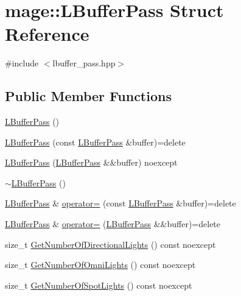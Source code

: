 \hypertarget{structmage_1_1_l_buffer_pass}{}\section{mage\+:\+:L\+Buffer\+Pass Struct Reference}
\label{structmage_1_1_l_buffer_pass}


{\ttfamily \#include $<$lbuffer\+\_\+pass.\+hpp$>$}

\subsection*{Public Member Functions}
\begin{DoxyCompactItemize}
\item 
\hyperlink{structmage_1_1_l_buffer_pass_acde2812780af700501ca945d62ed3dcc}{L\+Buffer\+Pass} ()
\item 
\hyperlink{structmage_1_1_l_buffer_pass_a0cd35fd1ded3c17d04c1689d1e30e476}{L\+Buffer\+Pass} (const \hyperlink{structmage_1_1_l_buffer_pass}{L\+Buffer\+Pass} \&buffer)=delete
\item 
\hyperlink{structmage_1_1_l_buffer_pass_ae68baaaa3fee2a76d64037f58d3e389b}{L\+Buffer\+Pass} (\hyperlink{structmage_1_1_l_buffer_pass}{L\+Buffer\+Pass} \&\&buffer) noexcept
\item 
\hyperlink{structmage_1_1_l_buffer_pass_ae9bad6fa2eb3827f9e28a3f21a974496}{$\sim$\+L\+Buffer\+Pass} ()
\item 
\hyperlink{structmage_1_1_l_buffer_pass}{L\+Buffer\+Pass} \& \hyperlink{structmage_1_1_l_buffer_pass_aec86026cd14a4b1609f709444bc453bd}{operator=} (const \hyperlink{structmage_1_1_l_buffer_pass}{L\+Buffer\+Pass} \&buffer)=delete
\item 
\hyperlink{structmage_1_1_l_buffer_pass}{L\+Buffer\+Pass} \& \hyperlink{structmage_1_1_l_buffer_pass_a3e4405a5af87c2c6f4839cb8502aa5de}{operator=} (\hyperlink{structmage_1_1_l_buffer_pass}{L\+Buffer\+Pass} \&\&buffer)=delete
\item 
size\+\_\+t \hyperlink{structmage_1_1_l_buffer_pass_a8a8c7af3c9c780f378411b928bb15a67}{Get\+Number\+Of\+Directional\+Lights} () const noexcept
\item 
size\+\_\+t \hyperlink{structmage_1_1_l_buffer_pass_a36adecea35365ec4ecc97698de68463c}{Get\+Number\+Of\+Omni\+Lights} () const noexcept
\item 
size\+\_\+t \hyperlink{structmage_1_1_l_buffer_pass_a52e32579e9843f3d6cf998cbf9a3f362}{Get\+Number\+Of\+Spot\+Lights} () const noexcept
\item 

\end{DoxyCompactItemize}
